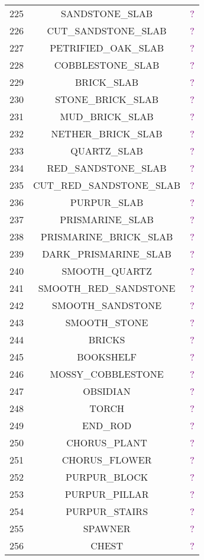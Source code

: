 \documentclass[11pt]{article}
\newcommand\myworries[1]{\textcolor{purple}{#1}}
\begin{document}
\begin{longtable}{ |c|c|c| }
	225 & SANDSTONE\_SLAB & \myworries{?} \\
	226 & CUT\_SANDSTONE\_SLAB & \myworries{?} \\
	227 & PETRIFIED\_OAK\_SLAB & \myworries{?} \\
	228 & COBBLESTONE\_SLAB & \myworries{?} \\
	229 & BRICK\_SLAB & \myworries{?} \\
	230 & STONE\_BRICK\_SLAB & \myworries{?} \\
	231 & MUD\_BRICK\_SLAB & \myworries{?} \\
	232 & NETHER\_BRICK\_SLAB & \myworries{?} \\
	233 & QUARTZ\_SLAB & \myworries{?} \\
	234 & RED\_SANDSTONE\_SLAB & \myworries{?} \\
	235 & CUT\_RED\_SANDSTONE\_SLAB & \myworries{?} \\
	236 & PURPUR\_SLAB & \myworries{?} \\
	237 & PRISMARINE\_SLAB & \myworries{?} \\
	238 & PRISMARINE\_BRICK\_SLAB & \myworries{?} \\
	239 & DARK\_PRISMARINE\_SLAB & \myworries{?} \\
	240 & SMOOTH\_QUARTZ & \myworries{?} \\
	241 & SMOOTH\_RED\_SANDSTONE & \myworries{?} \\
	242 & SMOOTH\_SANDSTONE & \myworries{?} \\
	243 & SMOOTH\_STONE & \myworries{?} \\
	244 & BRICKS & \myworries{?} \\
	245 & BOOKSHELF & \myworries{?} \\
	246 & MOSSY\_COBBLESTONE & \myworries{?} \\
	247 & OBSIDIAN & \myworries{?} \\
	248 & TORCH & \myworries{?} \\
	249 & END\_ROD & \myworries{?} \\
	250 & CHORUS\_PLANT & \myworries{?} \\
	251 & CHORUS\_FLOWER & \myworries{?} \\
	252 & PURPUR\_BLOCK & \myworries{?} \\
	253 & PURPUR\_PILLAR & \myworries{?} \\
	254 & PURPUR\_STAIRS & \myworries{?} \\
	255 & SPAWNER & \myworries{?} \\
	256 & CHEST & \myworries{?} \\

\end{longtable}
\end{document}
